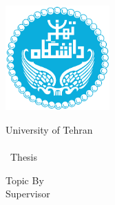 \thispagestyle{empty}
\begin{center}
	\begin{latin}
		\includegraphics[width=4cm]{images/UT_logo} \\
		\begin{Large}
		University of Tehran \\
		\enDep \\ [1cm]
		\enlevel\ Thesis \\ [6mm]
		\enmajor
		\end{Large}
		\vskip 1cm
		\large{Topic}   \textbf{\huge{\entitle}}
		\vskip 1.5cm
		\large{By}         \\ \Large{\enAuthor}
		\vskip 1cm
		\large{Supervisor} \\ \Large{\ensupervisor}
		\vskip 1.5cm
		\large{\engdate}
	\end{latin}
\end{center}

